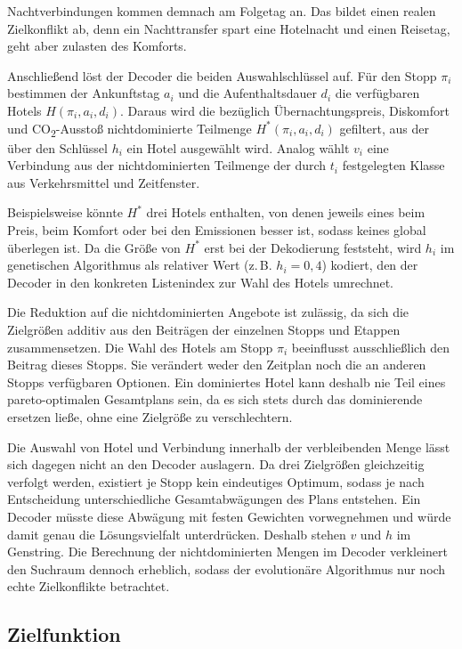 Nachtverbindungen kommen demnach am Folgetag an. Das bildet einen realen Zielkonflikt ab, denn ein Nachttransfer spart eine Hotelnacht und einen Reisetag, geht aber zulasten des Komforts.

Anschließend löst der Decoder die beiden Auswahlschlüssel auf. Für den Stopp $\pi_i$ bestimmen der Ankunftstag $a_i$ und die Aufenthaltsdauer $d_i$ die verfügbaren Hotels $H(\pi_i, a_i, d_i)$. Daraus wird die bezüglich Übernachtungspreis, Diskomfort und CO\textsubscript{2}-Ausstoß nichtdominierte Teilmenge $H^\ast(\pi_i, a_i, d_i)$ gefiltert, aus der über den Schlüssel $h_i$ ein Hotel ausgewählt wird. Analog wählt $v_i$ eine Verbindung aus der nichtdominierten Teilmenge der durch $t_i$ festgelegten Klasse aus Verkehrsmittel und Zeitfenster.

Beispielsweise könnte $H^\ast$ drei Hotels enthalten, von denen jeweils eines beim Preis, beim Komfort oder bei den Emissionen besser ist, sodass keines global überlegen ist. Da die Größe von $H^\ast$ erst bei der Dekodierung feststeht, wird $h_i$ im genetischen Algorithmus als relativer Wert (z.\,B. $h_i = 0{,}4$) kodiert, den der Decoder in den konkreten Listenindex zur Wahl des Hotels umrechnet. 

Die Reduktion auf die nichtdominierten Angebote ist zulässig, da sich die Zielgrößen additiv aus den Beiträgen der einzelnen Stopps und Etappen zusammensetzen. Die Wahl des Hotels am Stopp $\pi_i$ beeinflusst ausschließlich den Beitrag dieses Stopps. Sie verändert weder den Zeitplan noch die an anderen Stopps verfügbaren Optionen. Ein dominiertes Hotel kann deshalb nie Teil eines pareto-optimalen Gesamtplans sein, da es sich stets durch das dominierende ersetzen ließe, ohne eine Zielgröße zu verschlechtern.

Die Auswahl von Hotel und Verbindung innerhalb der verbleibenden Menge lässt sich dagegen nicht an den Decoder auslagern. Da drei Zielgrößen gleichzeitig verfolgt werden, existiert je Stopp kein eindeutiges Optimum, sodass je nach Entscheidung unterschiedliche Gesamtabwägungen des Plans entstehen. Ein Decoder müsste diese Abwägung mit festen Gewichten vorwegnehmen und würde damit genau die Lösungsvielfalt unterdrücken. Deshalb stehen $v$ und $h$ im Genstring. Die Berechnung der nichtdominierten Mengen im Decoder verkleinert den Suchraum dennoch erheblich, sodass der evolutionäre Algorithmus nur noch echte Zielkonflikte betrachtet.

\subsection{Zielfunktion}
\label{subsec:zielfunktion}

